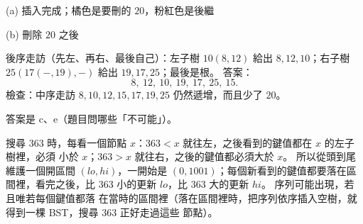 \begin{center}
\begin{minipage}{0.48\linewidth}\centering
{}

{\footnotesize (a) 插入完成；橘色是要刪的 $20$，粉紅色是後繼}
\end{minipage}\hfill
\begin{minipage}{0.48\linewidth}\centering
{}

{\footnotesize (b) 刪除 $20$ 之後}
\end{minipage}
\end{center}

後序走訪（先左、再右、最後自己）：左子樹 $10(8,12)$ 給出 $8, 12, 10$；右子樹 $25(17(-,19),-)$
給出 $19, 17, 25$；最後是根。 答案：
\[
8,\ 12,\ 10,\ 19,\ 17,\ 25,\ 15.
\]
檢查：中序走訪 $8, 10, 12, 15, 17, 19, 25$ 仍然遞增，而且少了 $20$。

答案是 c、e（題目問哪些「不可能」）。

搜尋 $363$ 時，每看一個節點 $x$：$363 < x$ 就往左，之後看到的鍵值都在 $x$ 的左子樹裡，必須
小於 $x$；$363 > x$ 就往右，之後的鍵值都必須大於 $x$。 所以從頭到尾維護一個開區間
$(\mathit{lo}, \mathit{hi})$，一開始是 $(0, 1001)$；每個新看到的鍵值都要落在區間裡，看完之後，比
$363$ 小的更新 $\mathit{lo}$，比 $363$ 大的更新 $\mathit{hi}$。 序列可能出現，若且唯若每個鍵值都落
在當時的區間裡（落在區間裡時，把序列依序插入空樹，就得到一棵 BST，搜尋 $363$ 正好走過這些
節點）。

